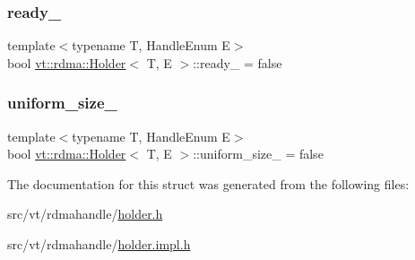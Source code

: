 \mbox{\label{structvt_1_1rdma_1_1_holder_ad61ee11705da8cf0ba8664b3173e7370}} 
\subsubsection{\texorpdfstring{ready\+\_\+}{ready\_}}
{\footnotesize\ttfamily template$<$typename T, Handle\+Enum E$>$ \\
bool \hyperlink{structvt_1_1rdma_1_1_holder}{vt\+::rdma\+::\+Holder}$<$ T, E $>$\+::ready\+\_\+ = false\hspace{0.3cm}{\ttfamily [private]}}

\mbox{\label{structvt_1_1rdma_1_1_holder_a6c137c841a55e053778597860c6761e8}} 
\subsubsection{\texorpdfstring{uniform\+\_\+size\+\_\+}{uniform\_size\_}}
{\footnotesize\ttfamily template$<$typename T, Handle\+Enum E$>$ \\
bool \hyperlink{structvt_1_1rdma_1_1_holder}{vt\+::rdma\+::\+Holder}$<$ T, E $>$\+::uniform\+\_\+size\+\_\+ = false\hspace{0.3cm}{\ttfamily [private]}}



The documentation for this struct was generated from the following files\+:\begin{DoxyCompactItemize}
\item 
src/vt/rdmahandle/\hyperlink{rdmahandle_2holder_8h}{holder.\+h}\item 
src/vt/rdmahandle/\hyperlink{rdmahandle_2holder_8impl_8h}{holder.\+impl.\+h}\end{DoxyCompactItemize}
